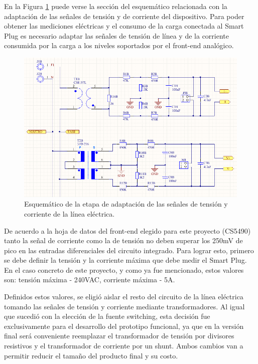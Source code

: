 En la Figura \ref{fig:pcb_adaptacion} puede verse la sección del esquemático relacionada con la adaptación de las señales de tensión y de corriente del dispositivo. Para poder obtener las mediciones eléctricas y el consumo de la carga conectada al Smart Plug es necesario adaptar las señales de tensión de línea y de la corriente consumida por la carga a los niveles soportados por el front-end analógico.

\begin{figure}[h]
	\centering
	\includegraphics[width=14cm]{./Figures/3_1_2_pcb_adaptacion.png}
	\caption{Esquemático de la etapa de adaptación de las señales de tensión y corriente de la línea eléctrica.}
	\label{fig:pcb_adaptacion}
\end{figure}

De acuerdo a la hoja de datos del front-end elegido para este proyecto (CS5490) tanto la señal de corriente como la de tensión no deben superar los 250mV de pico en las entradas diferenciales del circuito integrado. Para lograr esto, primero se debe definir la tensión y la corriente máxima que debe medir el Smart Plug. En el caso concreto de este proyecto, y como ya fue mencionado, estos valores son: tensión máxima - 240VAC, corriente máxima - 5A.

Definidos estos valores, se eligió aislar el resto del circuito de la línea eléctrica tomando las señales de tensión y corriente mediante transformadores. Al igual que sucedió con la elección de la fuente switching, esta decisión fue exclusivamente para el desarrollo del prototipo funcional, ya que en la versión final será conveniente reemplazar el transformador de tensión por divisores resistivos y el transformador de corriente por un shunt. Ambos cambios van a permitir reducir el tamaño del producto final y su costo.

